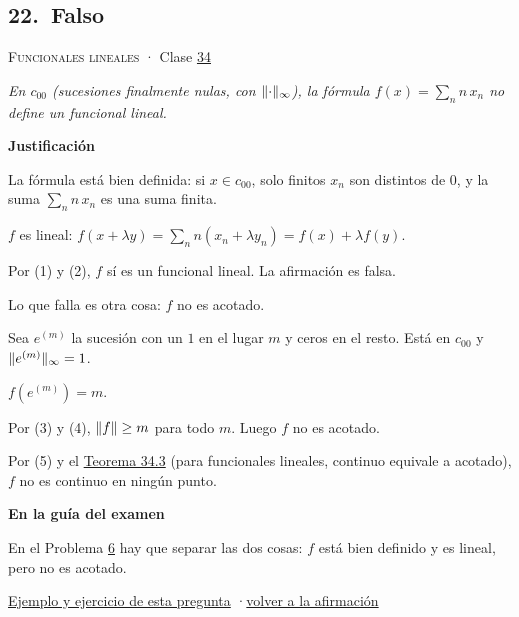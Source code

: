 \documentclass[11pt,a4paper]{article}
\newcommand{\bloque}[1]{\par\smallskip\noindent\textbf{\color{acento}#1}\par}
\begin{document}
\subsection*{\hypertarget{r-22}{}22.\ \textcolor{bad}{Falso}}
{\small \textsc{Funcionales lineales} · Clase \href{https://decostruttivismo.github.io/MAT2514-repaso/pdf/MAT2514_apuntes_completos.pdf\#nameddest=section.34}{34}}\par
\emph{En $c_{00}$ (sucesiones finalmente nulas, con $\lVert \cdot\rVert_\infty$), la fórmula $f(x)=\sum_nn\,x_n$ no define un funcional lineal.}
\bloque{Justificación}
\begin{pasos}
\item[(1)] La fórmula está bien definida: si $x\in c_{00}$, solo finitos $x_n$ son distintos de $0$, y la suma $\sum_nn\,x_n$ es una suma finita.
\item[(2)] $f$ es lineal: $f(x+\lambda y)=\sum_nn(x_n+\lambda y_n)=f(x)+\lambda f(y)$.
\item[] Por (1) y (2), $f$ sí es un funcional lineal. La afirmación es falsa.
\item[] Lo que falla es otra cosa: $f$ no es acotado.
\item[(3)] Sea $e^{(m)}$ la sucesión con un $1$ en el lugar $m$ y ceros en el resto. Está en $c_{00}$ y $\lVert e^{(m)}\rVert_\infty=1$.
\item[(4)] $f(e^{(m)})=m$.
\item[(5)] Por (3) y (4), $\lVert f\rVert\ge m$ para todo $m$. Luego $f$ no es acotado.
\item[(6)] Por (5) y el \href{https://decostruttivismo.github.io/MAT2514-repaso/pdf/MAT2514_apuntes_completos.pdf\#nameddest=teorema.34.3}{Teorema 34.3} (para funcionales lineales, continuo equivale a acotado), $f$ no es continuo en ningún punto.
\end{pasos}
\bloque{En la guía del examen}
\begin{pasos}
\item[] En el Problema \hyperlink{prob-6}{6} hay que separar las dos cosas: $f$ está bien definido y es lineal, pero no es acotado.
\end{pasos}
\par{}
\par{\small \hyperlink{e-22}{Ejemplo y ejercicio de esta pregunta} \quad·\quad \hyperlink{q-22}{volver a la afirmación}}
\end{document}

